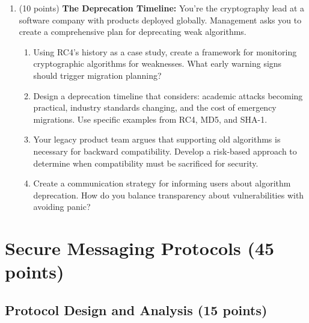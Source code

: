 \documentclass[10pt,a4paper,american]{article}
\begin{document}
\begin{enumerate}
	\item (10 points) \textbf{The Deprecation Timeline:}
	      You're the cryptography lead at a software company with products deployed globally. Management asks you to create a comprehensive plan for deprecating weak algorithms.
	      \begin{enumerate}
		      \item Using RC4's history as a case study, create a framework for monitoring cryptographic algorithms for weaknesses. What early warning signs should trigger migration planning?
		      \item Design a deprecation timeline that considers: academic attacks becoming practical, industry standards changing, and the cost of emergency migrations. Use specific examples from RC4, MD5, and SHA-1.
		      \item Your legacy product team argues that supporting old algorithms is necessary for backward compatibility. Develop a risk-based approach to determine when compatibility must be sacrificed for security.
		      \item Create a communication strategy for informing users about algorithm deprecation. How do you balance transparency about vulnerabilities with avoiding panic?
	      \end{enumerate}
\end{enumerate}

\section{Secure Messaging Protocols (45 points)}

\subsection{Protocol Design and Analysis (15 points)}
\end{document}
